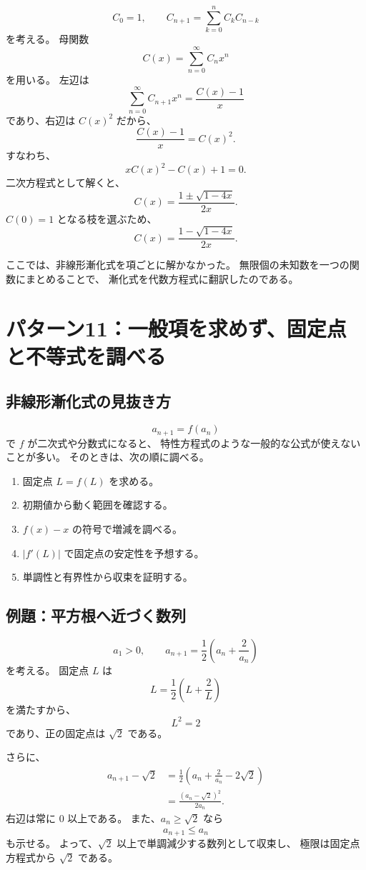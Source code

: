 \[
  C_0=1,\qquad
  C_{n+1}=\sum_{k=0}^{n}C_kC_{n-k}
\]
を考える。
母関数
\[
  C(x)=\sum_{n=0}^{\infty}C_nx^n
\]
を用いる。
左辺は
\[
  \sum_{n=0}^{\infty}C_{n+1}x^{n}
  =\frac{C(x)-1}{x}
\]
であり、右辺は $C(x)^2$ だから、
\[
  \frac{C(x)-1}{x}=C(x)^2.
\]
すなわち、
\[
  xC(x)^2-C(x)+1=0.
\]
二次方程式として解くと、
\[
  C(x)=\frac{1\pm\sqrt{1-4x}}{2x}.
\]
$C(0)=1$ となる枝を選ぶため、
\[
  C(x)=\frac{1-\sqrt{1-4x}}{2x}.
\]

ここでは、非線形漸化式を項ごとに解かなかった。
無限個の未知数を一つの関数にまとめることで、
漸化式を代数方程式に翻訳したのである。

\section{パターン11：一般項を求めず、固定点と不等式を調べる}

\subsection{非線形漸化式の見抜き方}

\[
  a_{n+1}=f(a_n)
\]
で $f$ が二次式や分数式になると、
特性方程式のような一般的な公式が使えないことが多い。
そのときは、次の順に調べる。

\begin{enumerate}
  \item 固定点 $L=f(L)$ を求める。
  \item 初期値から動く範囲を確認する。
  \item $f(x)-x$ の符号で増減を調べる。
  \item $|f'(L)|$ で固定点の安定性を予想する。
  \item 単調性と有界性から収束を証明する。
\end{enumerate}

\subsection{例題：平方根へ近づく数列}

\[
  a_1>0,\qquad
  a_{n+1}=\frac12\left(a_n+\frac{2}{a_n}\right)
\]
を考える。
固定点 $L$ は
\[
  L=\frac12\left(L+\frac2L\right)
\]
を満たすから、
\[
  L^2=2
\]
であり、正の固定点は $\sqrt2$ である。

さらに、
\[
  \begin{aligned}
    a_{n+1}-\sqrt2
     & =\frac12\left(a_n+\frac2{a_n}-2\sqrt2\right) \\
     & =\frac{(a_n-\sqrt2)^2}{2a_n}.
  \end{aligned}
\]
右辺は常に $0$ 以上である。
また、$a_n\ge\sqrt2$ なら
\[
  a_{n+1}\le a_n
\]
も示せる。
よって、$\sqrt2$ 以上で単調減少する数列として収束し、
極限は固定点方程式から $\sqrt2$ である。

